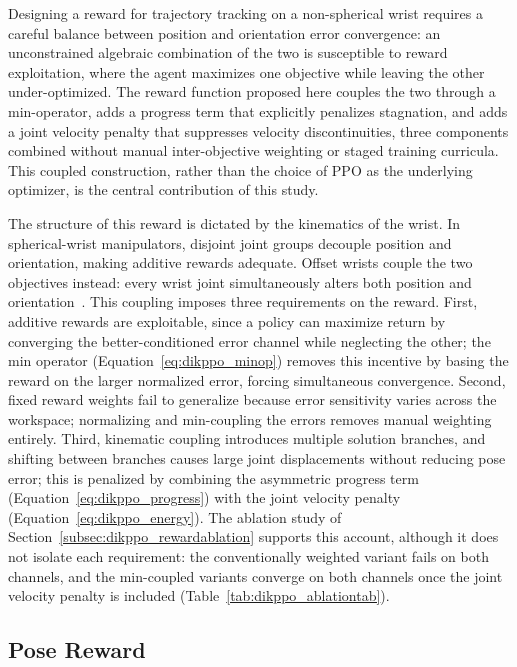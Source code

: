 Designing a reward for trajectory tracking on a non-spherical wrist requires a careful balance
between position and orientation error convergence: an unconstrained algebraic combination of the
two is susceptible to reward exploitation, where the agent maximizes one objective while leaving
the other under-optimized. The reward function proposed here couples the two through a
min-operator, adds a progress term that explicitly penalizes stagnation, and adds a joint velocity
penalty that suppresses velocity discontinuities, three components combined without manual
inter-objective weighting or staged training curricula. This coupled construction, rather than the
choice of PPO as the underlying optimizer, is the central contribution of this study.

The structure of this reward is dictated by the kinematics of the wrist. In spherical-wrist
manipulators, disjoint joint groups decouple position and orientation, making additive rewards
adequate. Offset wrists couple the two objectives instead: every wrist joint simultaneously alters
both position and orientation~\citep{li2021novel}. This coupling imposes three requirements on the
reward. First, additive rewards are exploitable, since a policy can maximize return by converging
the better-conditioned error channel while neglecting the other; the min operator
(Equation~\eqref{eq:dikppo_minop}) removes this incentive by basing the reward on the larger
normalized error, forcing simultaneous convergence. Second, fixed reward weights fail to generalize
because error sensitivity varies across the workspace; normalizing and min-coupling the errors
removes manual weighting entirely. Third, kinematic coupling introduces multiple solution branches,
and shifting between branches causes large joint displacements without reducing pose error; this is
penalized by combining the asymmetric progress term (Equation~\eqref{eq:dikppo_progress}) with the
joint velocity penalty (Equation~\eqref{eq:dikppo_energy}). The ablation study of
Section~\ref{subsec:dikppo_rewardablation} supports this account, although it does not isolate each
requirement: the conventionally weighted variant fails on both channels, and the min-coupled
variants converge on both channels once the joint velocity penalty is included
(Table~\ref{tab:dikppo_ablationtab}).

\subsection{Pose Reward}\label{subsec:dikppo_pose}

